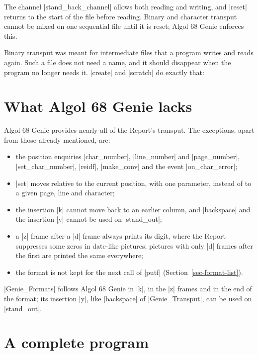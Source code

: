 
The channel \code|stand_back_channel| allows both reading and writing,
and \code|reset| returns to the start of the file before reading. Binary
and character transput cannot be mixed on one sequential file until it
is reset; Algol 68 Genie enforces this.

Binary transput was meant for intermediate files that a program writes
and reads again. Such a file does not need a name, and it should
disappear when the program no longer needs it. \code|create| and
\code|scratch| do exactly that:


\section{What Algol 68 Genie lacks}\label{sec-transput-genie}

Algol 68 Genie provides nearly all of the Report's transput. The
exceptions, apart from those already mentioned, are:
\begin{itemize}
\item the position enquiries \code|char_number|, \code|line_number| and
  \code|page_number|, \code|set_char_number|, \code|reidf|,
  \code|make_conv| and the event \code|on_char_error|;
\item \code|set| moves relative to the current position, with one
  parameter, instead of to a given page, line and character;
\item the insertion \code|k| cannot move back to an earlier column, and
  \code|backspace| and the insertion \code|y| cannot be used on
  \code|stand_out|;
\item a \code|z| frame after a \code|d| frame always prints its digit,
  where the Report suppresses some zeros in date-like pictures; pictures
  with only \code|d| frames after the first are printed the same
  everywhere;
\item the format is not kept for the next call of \code|putf|
  (Section~\ref{sec-format-list}).
\end{itemize}

\noindent \code|Genie_Formats| follows Algol 68 Genie in \code|k|, in
the \code|z| frames and in the end of the format; its insertion
\code|y|, like \code|backspace| of \code|Genie_Transput|, can be used on
\code|stand_out|.

\section{A complete program}\label{sec-transput-complete}

